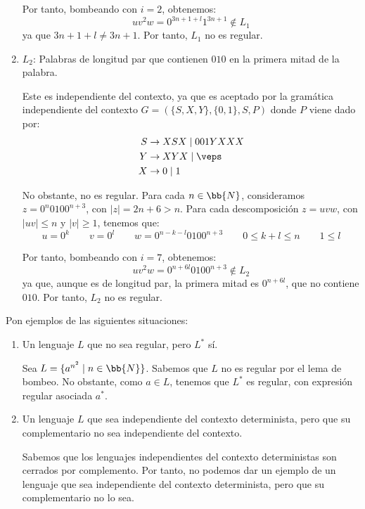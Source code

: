 \documentclass[12pt]{article}
\begin{document}
\begin{ejercicio}[1.25 puntos]
\begin{enumerate}
        Por tanto, bombeando con $i=2$, obtenemos:
        \begin{equation*}
            uv^2w=0^{3n+1+l}1^{3n+1}\notin L_1
        \end{equation*}
        ya que $3n+1+l\neq 3n+1$. Por tanto, $L_1$ no es regular.
        \item $L_2$: Palabras de longitud par que contienen $010$ en la primera mitad de la palabra.
        
        Este es independiente del contexto, ya que es aceptado por la gramática independiente del contexto $G=(\{S,X,Y\}, \{0,1\}, S, P)$ donde $P$ viene dado por:
        \begin{align*}
            S &\rightarrow XSX\mid 001YXXX\\
            Y &\rightarrow XYX \mid \veps\\
            X & \rightarrow 0\mid 1
        \end{align*}

        No obstante, no es regular. Para cada $n\in \bb{N}$, consideramos $z=0^{n}0100^{n+3}$, con $|z|=2n+6>n$. Para cada descomposición $z=uvw$, con $|uv|\leq n$ y $|v|\geq 1$, tenemos que:
        \begin{equation*}
            u=0^k \qquad v=0^l\qquad w=0^{n-k-l}0100^{n+3}
            \qquad 0\leq k+l\leq n \qquad 1\leq l
        \end{equation*}

        Por tanto, bombeando con $i=7$, obtenemos:
        \begin{equation*}
            uv^2w=0^{n+6l}0100^{n+3}\notin L_2
        \end{equation*}
        ya que, aunque es de longitud par, la primera mitad es $0^{n+6l}$, que no contiene $010$. Por tanto, $L_2$ no es regular.
    \end{enumerate}
\end{ejercicio}

\begin{ejercicio}[1.25 puntos]
    Pon ejemplos de las siguientes situaciones:
    \begin{enumerate}
        \item Un lenguaje $L$ que no sea regular, pero $L^*$ sí.
        
        Sea $L=\{a^{n^2}\mid n\in \bb{N}\}$. Sabemos que $L$ no es regular por el lema de bombeo.
        No obstante, como $a\in L$, tenemos que $L^*$ es regular, con expresión regular asociada $a^*$.
        \item Un lenguaje $L$ que sea independiente del contexto determinista, pero que su complementario no sea independiente del contexto.
        
        Sabemos que los lenguajes independientes del contexto deterministas son cerrados por complemento. Por tanto, no podemos dar un ejemplo de un lenguaje que sea independiente del contexto determinista, pero que su complementario no lo sea.
    \end{enumerate}
\end{ejercicio}
\end{document}
